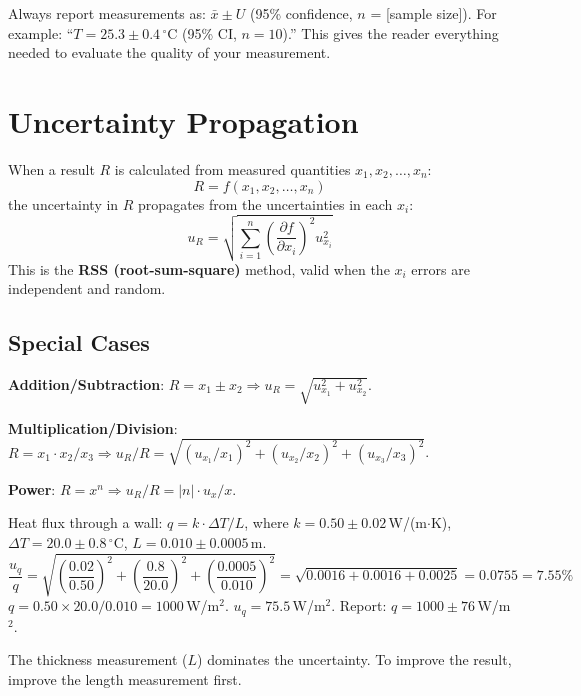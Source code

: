 \documentclass[11pt,letterpaper,twoside,openany]{book}
\newcommand{\degC}{\ensuremath{{}^{\circ}\text{C}}}
\begin{document}
\begin{tipbox}
Always report measurements as: $\bar{x} \pm U$ (95\% confidence, $n$ = [sample size]). For example: ``$T = 25.3 \pm 0.4$\,\degC{} (95\% CI, $n = 10$).'' This gives the reader everything needed to evaluate the quality of your measurement.
\end{tipbox}

\section{Uncertainty Propagation}

When a result $R$ is calculated from measured quantities $x_1, x_2, \ldots, x_n$:
\begin{equation}
R = f(x_1, x_2, \ldots, x_n)
\end{equation}
the uncertainty in $R$ propagates from the uncertainties in each $x_i$:
\begin{equation}
u_R = \sqrt{\sum_{i=1}^{n} \left(\frac{\partial f}{\partial x_i}\right)^2 u_{x_i}^2}
\end{equation}
This is the \textbf{RSS (root-sum-square)} method, valid when the $x_i$ errors are independent and random.

\subsection{Special Cases}
\textbf{Addition/Subtraction}: $R = x_1 \pm x_2 \Rightarrow u_R = \sqrt{u_{x_1}^2 + u_{x_2}^2}$.

\textbf{Multiplication/Division}: $R = x_1 \cdot x_2 / x_3 \Rightarrow u_R/R = \sqrt{(u_{x_1}/x_1)^2 + (u_{x_2}/x_2)^2 + (u_{x_3}/x_3)^2}$.

\textbf{Power}: $R = x^n \Rightarrow u_R/R = |n| \cdot u_x / x$.

\begin{examplebox}
Heat flux through a wall: $q = k \cdot \Delta T / L$, where $k = 0.50 \pm 0.02$\,W/(m$\cdot$K), $\Delta T = 20.0 \pm 0.8$\,\degC{}, $L = 0.010 \pm 0.0005$\,m.
\[
\frac{u_q}{q} = \sqrt{\left(\frac{0.02}{0.50}\right)^2 + \left(\frac{0.8}{20.0}\right)^2 + \left(\frac{0.0005}{0.010}\right)^2} = \sqrt{0.0016 + 0.0016 + 0.0025} = 0.0755 = 7.55\%
\]
$q = 0.50 \times 20.0 / 0.010 = 1000$\,W/m$^2$. $u_q = 75.5$\,W/m$^2$. Report: $q = 1000 \pm 76$\,W/m$^2$.

The thickness measurement ($L$) dominates the uncertainty. To improve the result, improve the length measurement first.
\end{examplebox}
\end{document}
